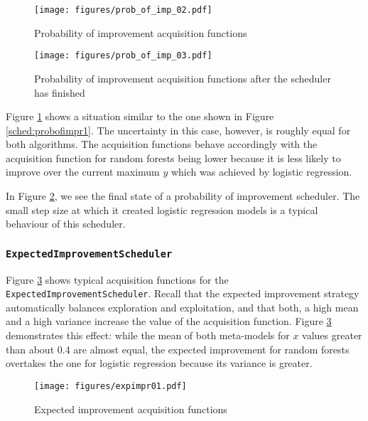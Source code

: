 \documentclass[a4paper,12pt,twoside,openright]{report}
\begin{document}
\begin{figure}[p]
\centering
  \texttt{[image: figures/prob\_of\_imp\_02.pdf]}
  \caption{Probability of improvement acquisition functions}
  \label{sched:probofimpr2}
\end{figure}

\begin{figure}[p]
\centering
  \texttt{[image: figures/prob\_of\_imp\_03.pdf]}
  \caption{Probability of improvement acquisition functions after the scheduler has finished}
  \label{sched:probofimpr3}
\end{figure}

Figure \ref{sched:probofimpr2} shows a situation similar to the one shown in Figure \ref{sched:probofimpr1}. The uncertainty in this case, however, is roughly equal for both algorithms. The acquisition functions behave accordingly with the acquisition function for random forests being lower because it is less likely to improve over the current maximum $y$ which was achieved by logistic regression.



In Figure \ref{sched:probofimpr3}, we see the final state of a probability of improvement scheduler. The small step size at which it created logistic regression models is a typical behaviour of this scheduler. 

\subsubsection{\texttt{ExpectedImprovementScheduler}}


Figure \ref{sched:expimpr01} shows typical acquisition functions for the \texttt{Expected\-Improvement\-Scheduler}. Recall that the expected improvement strategy automatically balances exploration and exploitation, and that both, a high mean and a high variance increase the value of the acquisition function. Figure \ref{sched:expimpr01} demonstrates this effect: while the mean of both meta-models for $x$ values greater than about 0.4 are almost equal, the expected improvement for random forests overtakes the one for logistic regression because its variance is greater.

\begin{figure}
\centering
  \texttt{[image: figures/expimpr01.pdf]}
  \caption{Expected improvement acquisition functions}
  \label{sched:expimpr01}
\end{figure}
\end{document}
